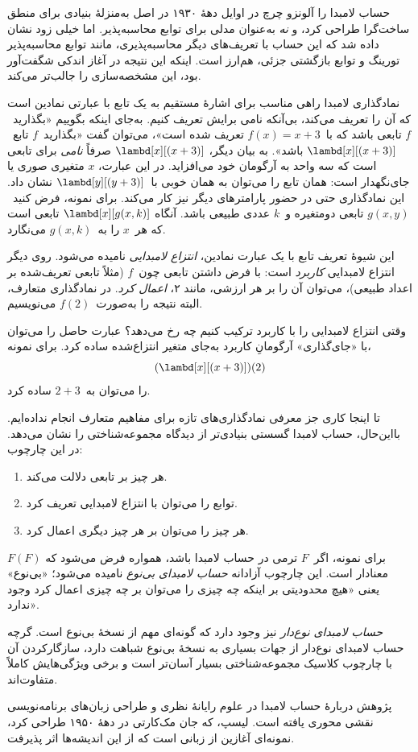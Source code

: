 \documentclass[../../../include/open-logic-section]{subfiles}
\begin{document}

حساب لامبدا را آلونزو چرچ در اوایل دههٔ ۱۹۳۰ در اصل به‌منزلهٔ بنیادی
برای منطق ساخت‌گرا طراحی کرد، و ‌\emph{نه} به‌عنوان مدلی برای توابع
محاسبه‌پذیر. اما خیلی زود نشان داده شد که این حساب با تعریف‌های دیگر
محاسبه‌پذیری، مانند توابع محاسبه‌پذیر تورینگ و توابع بازگشتی جزئی، هم‌ارز
است. اینکه این نتیجه در آغاز اندکی شگفت‌آور بود، این مشخصه‌سازی را
جالب‌تر می‌کند.

نمادگذاری لامبدا راهی مناسب برای اشارهٔ مستقیم به یک تابع با عبارتی
نمادین است که آن را تعریف می‌کند، بی‌آنکه نامی برایش تعریف کنیم. به‌جای
اینکه بگوییم «بگذارید~$f$ تابعی باشد که با~$f(x) = x + 3$ تعریف شده
است»، می‌توان گفت «بگذارید~$f$ تابع~$\lambd[x][(x + 3)]$ باشد». به بیان
دیگر، $\lambd[x][(x+3)]$ صرفاً \emph{نامی} برای تابعی است که سه واحد به
آرگومان خود می‌افزاید. در این عبارت، $x$ متغیری صوری یا جای‌نگهدار است:
همان تابع را می‌توان به همان خوبی با~$\lambd[y][(y + 3)]$ نشان داد. این
نمادگذاری حتی در حضور پارامترهای دیگر نیز کار می‌کند. برای نمونه، فرض
کنید~$g(x, y)$ تابعی دو‌متغیره و~$k$ عددی طبیعی باشد. آنگاه
$\lambd[x][g(x,k)]$ تابعی است که هر~$x$ را به~$g(x, k)$ می‌نگارد.

این شیوهٔ تعریف تابع با یک عبارت نمادین، \emph{انتزاع لامبدایی} نامیده
می‌شود. روی دیگر انتزاع لامبدایی \emph{کاربرد} است: با فرض داشتن تابعی
چون~$f$ (مثلاً تابعی تعریف‌شده بر اعداد طبیعی)، می‌توان آن را بر هر
ارزشی، مانند ۲، \emph{اعمال کرد}. در نمادگذاری متعارف، البته نتیجه را
به‌صورت~$f(2)$ می‌نویسیم.

وقتی انتزاع لامبدایی را با کاربرد ترکیب کنیم چه رخ می‌دهد؟ عبارت حاصل
را می‌توان با «جای‌گذاری» آرگومانِ کاربرد به‌جای متغیر انتزاع‌شده ساده
کرد. برای نمونه،
\[
(\lambd[x][(x + 3)])(2)
\]
را می‌توان به~$2 + 3$ ساده کرد.

تا اینجا کاری جز معرفی نمادگذاری‌های تازه برای مفاهیم متعارف انجام
نداده‌ایم. بااین‌حال، حساب لامبدا گسستی بنیادی‌تر از دیدگاه
مجموعه‌شناختی را نشان می‌دهد. در این چارچوب:
\begin{enumerate}
\item هر چیز بر تابعی دلالت می‌کند.
\item توابع را می‌توان با انتزاع لامبدایی تعریف کرد.
\item هر چیز را می‌توان بر هر چیز دیگری اعمال کرد.
\end{enumerate}
برای نمونه، اگر~$F$ ترمی در حساب لامبدا باشد، همواره فرض می‌شود که
$F(F)$ معنادار است. این چارچوب آزادانه \emph{حساب لامبدای بی‌نوع}
نامیده می‌شود؛ «بی‌نوع» یعنی «هیچ محدودیتی بر اینکه چه چیزی را می‌توان
بر چه چیزی اعمال کرد وجود ندارد».

\begin{digress}
\emph{حساب لامبدای نوع‌دار} نیز وجود دارد که گونه‌ای مهم از نسخۀ بی‌نوع
است. گرچه حساب لامبدای نوع‌دار از جهات بسیاری به نسخۀ بی‌نوع شباهت دارد،
سازگارکردن آن با چارچوب کلاسیک مجموعه‌شناختی بسیار آسان‌تر است و برخی
ویژگی‌هایش کاملاً متفاوت‌اند.

پژوهش دربارهٔ حساب لامبدا در علوم رایانۀ نظری و طراحی زبان‌های
برنامه‌نویسی نقشی محوری یافته است. لیسپ، که جان مک‌کارتی در دههٔ ۱۹۵۰
طراحی کرد، نمونه‌ای آغازین از زبانی است که از این اندیشه‌ها اثر پذیرفت.
\end{digress}
\end{document}
